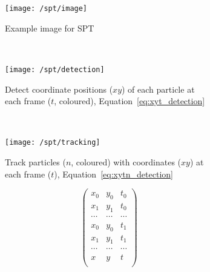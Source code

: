 
\begin{figure}
    \centering
    \begin{subfigure}[t]{0.4\linewidth}
            \centering
            \texttt{[image: /spt/image]}
            \caption{Example image for \gls{SPT}}
    \end{subfigure}\\\vspace{\abovecaptionskip}
    \begin{subfigure}[t]{0.45\linewidth}
            \centering
            \texttt{[image: /spt/detection]}
            \caption{
                Detect coordinate positions (\(xy\)) of each particle at each frame (\(t\), coloured), Equation~\eqref{eq:xyt_detection}
            }
    \end{subfigure}~~
    \begin{subfigure}[t]{0.45\linewidth}
            \centering
            \texttt{[image: /spt/tracking]}
            \caption{
                Track particles (\(n\), coloured) with coordinates (\(xy\)) at each frame (\(t\)), Equation~\eqref{eq:xytn_detection}
            }
    \end{subfigure}
    \caption{Routine for detecting and tracking particles.}\label{fig:particle_track}
    \begin{subfigure}[t]{0.45\linewidth}
        \centering
        \begin{equation}
            \begin{pmatrix}
              x_0 & y_0 & t_0 \\
              x_1 & y_1 & t_0 \\
              \cdots & \cdots & \cdots \\
              x_0 & y_0 & t_1 \\
              x_1 & y_1 & t_1 \\
              \cdots & \cdots & \cdots \\
              x & y & t \\
          \end{pmatrix}\label{eq:xyt_detection}
        \end{equation}
    \end{subfigure}~~
    \begin{subfigure}[t]{0.45\linewidth}
            \centering
            \begin{equation}

\end{equation}
\end{subfigure}
\end{figure}
